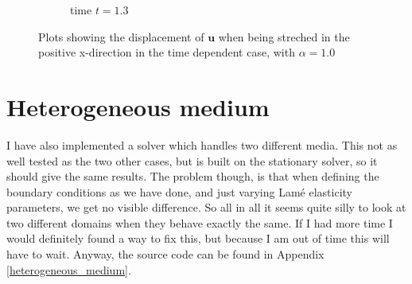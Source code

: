 \documentclass[twoside]{article}
\begin{document}
\begin{figure}
\begin{subfigure}[h]{0.31\textwidth}
                \caption{time \( t = 1.3\)}
                \label{fig:test_t=1.3}
        \end{subfigure}
        \caption{Plots showing the displacement of \( \mathbf{u}\) when being streched in the positive x-direction in the time dependent case, with \( \alpha = 1.0\)}
\end{figure}


\section{Heterogeneous medium}
I have also implemented a solver which handles two different media. This not as well tested as the two other cases, but is built on the stationary solver, so it should give the same results. The problem though, is that when defining the boundary conditions as we have done, and just varying Lam\'{e} elasticity parameters, we get no visible difference. So all in all it seems quite silly to look at two different domains when they behave exactly the same. If I had more time I would definitely found a way to fix this, but because I am out of time this will have to wait. Anyway, the source code can be found in Appendix \ref{heterogeneous_medium}.



\appendix
\end{document}
